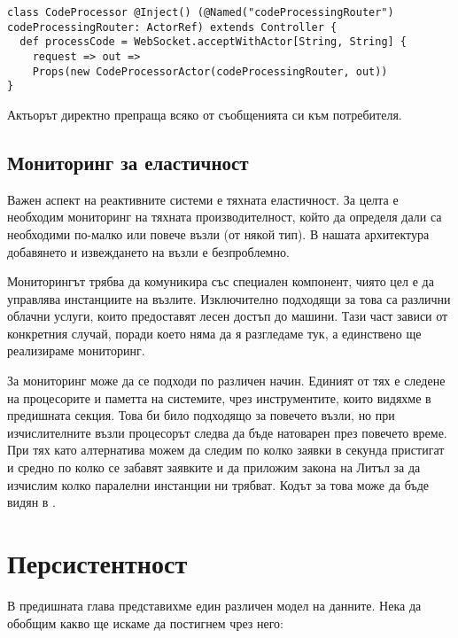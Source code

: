 \begin{lstlisting}
class CodeProcessor @Inject() (@Named("codeProcessingRouter") codeProcessingRouter: ActorRef) extends Controller {
  def processCode = WebSocket.acceptWithActor[String, String] {
    request => out =>
    Props(new CodeProcessorActor(codeProcessingRouter, out))
}
\end{lstlisting}

Актьорът директно препраща всяко от съобщенията си към потребителя.

\subsection{Мониторинг за еластичност}

Важен аспект на реактивните системи е тяхната еластичност. За целта е необходим мониторинг на тяхната производителност, който да определя дали са необходими по-малко или повече възли (от някой тип). В нашата архитектура добавянето и извеждането на възли е безпроблемно.

Мониторингът трябва да комуникира със специален компонент, чиято цел е да управлява инстанциите на възлите. Изключително подходящи за това са различни облачни услуги, които предоставят лесен достъп до машини. Тази част зависи от конкретния случай, поради което няма да я разгледаме тук, а единствено ще реализираме мониторинг.

За мониторинг може да се подходи по различен начин. Единият от тях е следене на процесорите и паметта на системите, чрез инструментите, които видяхме в предишната секция. Това би било подходящо за повечето възли, но при изчислителните възли процесорът следва да бъде натоварен през повечето време. При тях като алтернатива можем да следим по колко заявки в секунда пристигат и средно по колко се забавят заявките и да приложим закона на Литъл за да изчислим колко паралелни инстанции ни трябват. Кодът за това може да бъде видян в .

\section{Персистентност}

В предишната глава представихме един различен модел на данните. Нека да обобщим какво ще искаме да постигнем чрез него:

